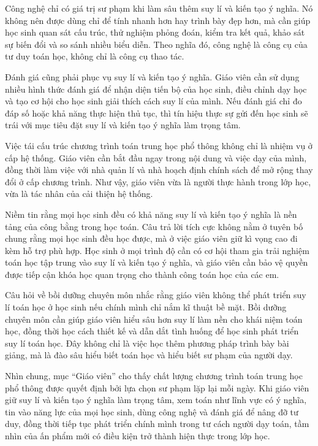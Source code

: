 {{    Công nghệ chỉ có giá trị sư phạm khi làm sâu thêm suy lí và kiến tạo ý nghĩa. Nó không nên được dùng chỉ để tính nhanh hơn hay trình bày đẹp hơn, mà cần giúp học sinh quan sát cấu trúc, thử nghiệm phỏng đoán, kiểm tra kết quả, khảo sát sự biến đổi và so sánh nhiều biểu diễn. Theo nghĩa đó, công nghệ là công cụ của tư duy toán học, không chỉ là công cụ thao tác.

    Đánh giá cũng phải phục vụ suy lí và kiến tạo ý nghĩa. Giáo viên cần sử dụng nhiều hình thức đánh giá để nhận diện tiến bộ của học sinh, điều chỉnh dạy học và tạo cơ hội cho học sinh giải thích cách suy lí của mình. Nếu đánh giá chỉ đo đáp số hoặc khả năng thực hiện thủ tục, thì tín hiệu thực sự gửi đến học sinh sẽ trái với mục tiêu đặt suy lí và kiến tạo ý nghĩa làm trọng tâm.

    Việc tái cấu trúc chương trình toán trung học phổ thông không chỉ là nhiệm vụ ở cấp hệ thống. Giáo viên cần bắt đầu ngay trong nội dung và việc dạy của mình, đồng thời làm việc với nhà quản lí và nhà hoạch định chính sách để mở rộng thay đổi ở cấp chương trình. Như vậy, giáo viên vừa là người thực hành trong lớp học, vừa là tác nhân của cải thiện hệ thống.

    Niềm tin rằng mọi học sinh đều có khả năng suy lí và kiến tạo ý nghĩa là nền tảng của công bằng trong học toán. Câu trả lời tích cực không nằm ở tuyên bố chung rằng mọi học sinh đều học được, mà ở việc giáo viên giữ kì vọng cao đi kèm hỗ trợ phù hợp. Học sinh ở mọi trình độ cần có cơ hội tham gia trải nghiệm toán học tập trung vào suy lí và kiến tạo ý nghĩa, và giáo viên cần bảo vệ quyền được tiếp cận khóa học quan trọng cho thành công toán học của các em.

    Câu hỏi về bồi dưỡng chuyên môn nhắc rằng giáo viên không thể phát triển suy lí toán học ở học sinh nếu chính mình chỉ nắm kĩ thuật bề mặt. Bồi dưỡng chuyên môn cần giúp giáo viên hiểu sâu hơn suy lí làm nền cho khái niệm toán học, đồng thời học cách thiết kế và dẫn dắt tình huống để học sinh phát triển suy lí toán học. Đây không chỉ là việc học thêm phương pháp trình bày bài giảng, mà là đào sâu hiểu biết toán học và hiểu biết sư phạm của người dạy.

    Nhìn chung, mục ``Giáo viên'' cho thấy chất lượng chương trình toán trung học phổ thông được quyết định bởi lựa chọn sư phạm lặp lại mỗi ngày. Khi giáo viên giữ suy lí và kiến tạo ý nghĩa làm trọng tâm, xem toán như lĩnh vực có ý nghĩa, tin vào năng lực của mọi học sinh, dùng công nghệ và đánh giá để nâng đỡ tư duy, đồng thời tiếp tục phát triển chính mình trong tư cách người dạy toán, tầm nhìn của ấn phẩm mới có điều kiện trở thành hiện thực trong lớp học.}
  }

